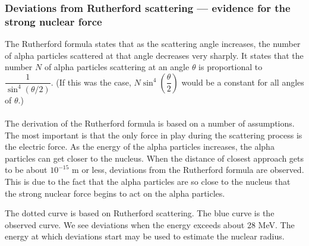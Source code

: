 \subsubsection*{Deviations from Rutherford scattering — evidence for the strong nuclear force}
The Rutherford formula states that as the scattering angle increases, the number of alpha particles scattered at that angle decreases very sharply.
It states that the number $N$ of alpha particles scattering at an angle $\theta$ is proportional to $\dfrac{1}{\sin^4(\theta/2)}$. (If this was the case, $N\sin^4\left(\dfrac{\theta}{2}\right)$ would be a constant for all angles of $\theta$.)\\\\
The derivation of the Rutherford formula is based on a number of assumptions. The most important is that the only force in play during the scattering process is the electric force. As the energy of the alpha particles increases, the alpha particles can get closer to the nucleus. When the distance of closest approach gets to be
about $10^{-15}$ m or less, deviations from the Rutherford formula are observed. This is due to the fact that the alpha particles are so close to the nucleus that the strong nuclear force begins to act on the alpha particles. 
\begin{center}
\end{center}
The dotted curve is based on Rutherford scattering. The blue curve is the observed curve. We see deviations when the energy exceeds about 28 MeV. The energy at which deviations start may be used to estimate the nuclear radius.
